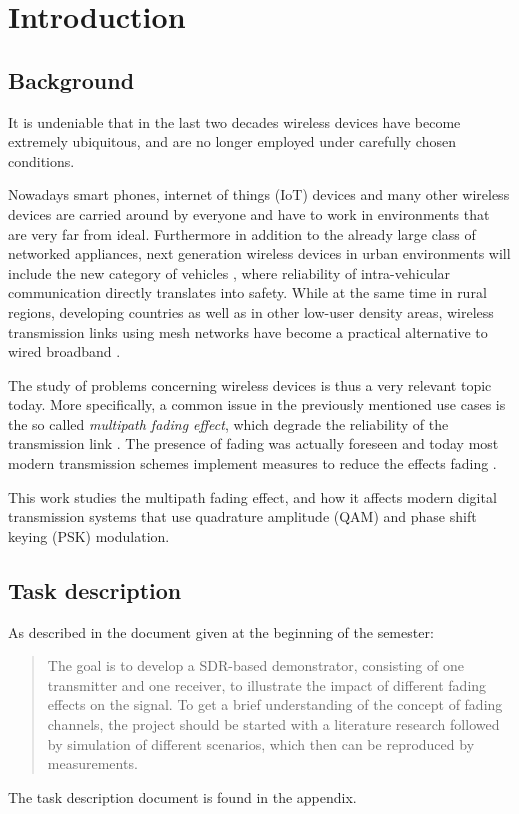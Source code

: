 
\chapter{Introduction}

\section{Background}

It is undeniable that in the last two decades wireless devices have become extremely ubiquitous, and are no longer employed under carefully chosen conditions.

Nowadays smart phones, internet of things (IoT) devices and many other wireless devices are carried around by everyone and have to work in environments that are very far from ideal. Furthermore in addition to the already large class of networked appliances, next generation wireless devices in urban environments will include the new category of vehicles \cite{AntonescuTB17}, where reliability of intra-vehicular communication directly translates into safety. While at the same time in rural regions, developing countries as well as in other low-user density areas, wireless transmission links using mesh networks have become a practical alternative to wired broadband \cite{Macmillan2019tidal,Subramanian2006rethinking,Flickenger2007wireless}.

The study of problems concerning wireless devices is thus a very relevant topic today. More specifically, a common issue in the previously mentioned use cases is the so called \emph{multipath fading effect}, which degrade the reliability of the transmission link \cite{Mathis, Gallager}. The presence of fading was actually foreseen \cite{Frederiksen2002overview,Maddocks1993introduction} and today most modern transmission schemes implement measures to reduce the effects fading \cite{Mathis,Hsu}.

This work studies the multipath fading effect, and how it affects modern digital transmission systems that use quadrature amplitude (QAM) and phase shift keying (PSK) modulation.

\section{Task description}

As described in the document given at the beginning of the semester:
\begin{quote}
	The goal is to develop a SDR-based demonstrator, consisting of one transmitter and one receiver, to illustrate the impact of different fading effects on the signal. To get a brief understanding of the concept of fading channels, the project should be started with a literature research followed by simulation of different scenarios, which then can be reproduced by measurements.
\end{quote}
The task description document is found in the appendix.

